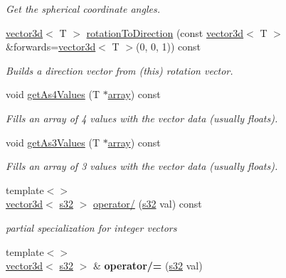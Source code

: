 \begin{DoxyCompactItemize}
\begin{DoxyCompactList}\small\item\em Get the spherical coordinate angles. \end{DoxyCompactList}\item 
\hyperlink{classirr_1_1core_1_1vector3d}{vector3d}$<$ T $>$ \hyperlink{classirr_1_1core_1_1vector3d_a4db5cfbb71995227e37334a19278474d}{rotation\+To\+Direction} (const \hyperlink{classirr_1_1core_1_1vector3d}{vector3d}$<$ T $>$ \&forwards=\hyperlink{classirr_1_1core_1_1vector3d}{vector3d}$<$ T $>$(0, 0, 1)) const 
\begin{DoxyCompactList}\small\item\em Builds a direction vector from (this) rotation vector. \end{DoxyCompactList}\item 
void \hyperlink{classirr_1_1core_1_1vector3d_a357c8d00022e04a68fb20b24f9eb34ce}{get\+As4\+Values} (T $\ast$\hyperlink{classirr_1_1core_1_1array}{array}) const 
\begin{DoxyCompactList}\small\item\em Fills an array of 4 values with the vector data (usually floats). \end{DoxyCompactList}\item 
void \hyperlink{classirr_1_1core_1_1vector3d_a543aaa4376afd2b5321228fa71540329}{get\+As3\+Values} (T $\ast$\hyperlink{classirr_1_1core_1_1array}{array}) const 
\begin{DoxyCompactList}\small\item\em Fills an array of 3 values with the vector data (usually floats). \end{DoxyCompactList}\item 
{\footnotesize template$<$$>$ }\\\hyperlink{classirr_1_1core_1_1vector3d}{vector3d}$<$ \hyperlink{namespaceirr_ac66849b7a6ed16e30ebede579f9b47c6}{s32} $>$ \hyperlink{classirr_1_1core_1_1vector3d_a7597f07300c420146117f2e5854153c2}{operator/} (\hyperlink{namespaceirr_ac66849b7a6ed16e30ebede579f9b47c6}{s32} val) const\hypertarget{classirr_1_1core_1_1vector3d_a7597f07300c420146117f2e5854153c2}{}\label{classirr_1_1core_1_1vector3d_a7597f07300c420146117f2e5854153c2}

\begin{DoxyCompactList}\small\item\em partial specialization for integer vectors \end{DoxyCompactList}\item 
{\footnotesize template$<$$>$ }\\\hyperlink{classirr_1_1core_1_1vector3d}{vector3d}$<$ \hyperlink{namespaceirr_ac66849b7a6ed16e30ebede579f9b47c6}{s32} $>$ \& {\bfseries operator/=} (\hyperlink{namespaceirr_ac66849b7a6ed16e30ebede579f9b47c6}{s32} val)\hypertarget{classirr_1_1core_1_1vector3d_a1d153631bde79b7bf50c2ab453d2bc60}{}\label{classirr_1_1core_1_1vector3d_a1d153631bde79b7bf50c2ab453d2bc60}


\end{DoxyCompactItemize}

